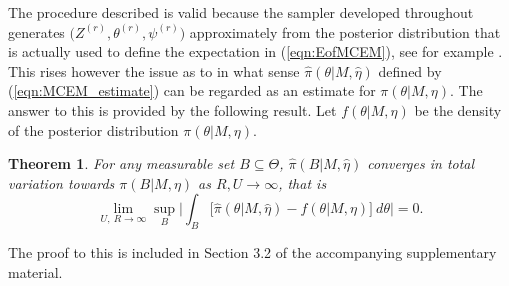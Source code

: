 \documentclass{bioinfo}
\newtheorem{thrm}{Theorem}
\begin{document}
The procedure described is valid because the sampler developed
throughout generates $\big(Z^{(r)}, \theta^{(r)}, \psi^{(r)}\big)$
approximately from the posterior distribution that is actually used to
define the expectation in (\ref{eqn:EofMCEM}), see for example
\cite{FM}. This rises however the issue as to in what sense
$\widehat\pi(\theta|M, \hat\eta)$ defined by (\ref{eqn:MCEM_estimate})
can be regarded as an estimate for $\pi(\theta|M, \eta)$. The answer
to this is provided by the following result. Let $f(\theta|M, \eta)$
be the density of the posterior distribution $\pi(\theta|M, \eta)$.

\begin{thrm} For any measurable set $B\subseteq \Theta$,
 $\widehat\pi(B|M,\hat\eta)$ converges in total variation
towards $\pi(B|M,\eta)$ as $R, U \to \infty$, that is
\[
   \lim_{U,\ R\to\infty}
   \sup_{B}
    \bigg|
     \int_B
     \Big[
       \widehat \pi(\theta|M, \hat\eta) - f(\theta|M,\eta)
     \Big]\ d\theta
    \bigg|
   = 0.
\]
\end{thrm}

The proof to this is included in Section 3.2 of the accompanying 
supplementary material.
\end{document}
